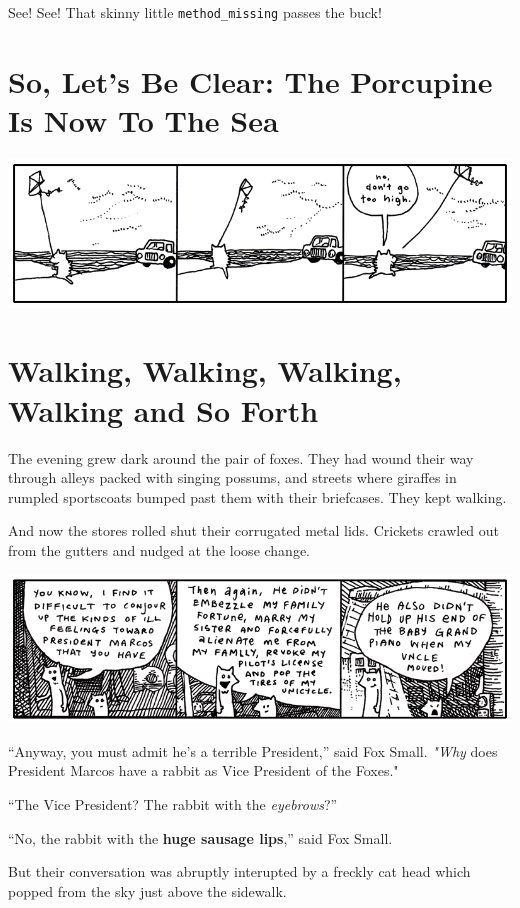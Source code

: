 \documentclass[10pt,twoside]{report}
\begin{document}
See!  See!  That skinny little
\lstinline[breaklines=true]|method_missing| passes the buck!


\section{So, Let's Be Clear: The Porcupine Is Now To The Sea}


	\includegraphics[width=1.0\textwidth]{cache/66.png}


\section{Walking, Walking, Walking, Walking and So Forth}


The evening grew dark around the pair of foxes.  They had wound their
way through alleys packed with singing possums, and streets where
giraffes in rumpled sportscoats bumped past them with their
briefcases.  They kept walking.

And now the stores rolled shut their corrugated metal lids.  Crickets
crawled out from the gutters and nudged at the loose change.

	\includegraphics[width=1.0\textwidth]{cache/67.png}

``Anyway, you must admit he's a terrible President,'' said Fox
        Small. {\em "Why} does President Marcos have a rabbit as Vice
        President of the Foxes."

``The Vice President?  The rabbit with the {\em eyebrows}?''

``No, the rabbit with the {\bf huge sausage lips},'' said Fox Small.

But their conversation was abruptly interupted by a freckly cat head
which popped from the sky just above the sidewalk.
\end{document}
